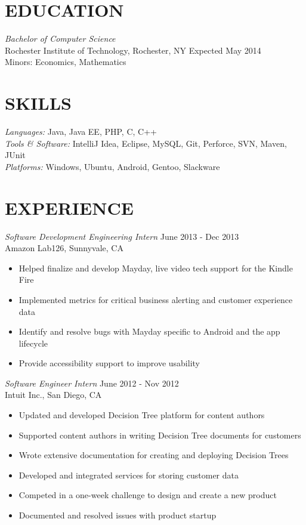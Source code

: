 \documentclass[line,margin]{res}
\begin{document}
\address{1253 Birch Street, Boonton, NJ 07005}
\address{kurtz.grant@gmail.com |  (203) 240-7149}

 
\begin{resume}
 
\section{EDUCATION} {\sl Bachelor of Computer Science} \\
	Rochester Institute of Technology, Rochester, NY  \hfill Expected May 2014 \\
	Minors: Economics, Mathematics
	
 
\section{SKILLS} {\sl Languages:} Java, Java EE, PHP, C, C++ \\
		{\sl Tools \& Software:} IntelliJ Idea, Eclipse, MySQL, Git, Perforce, SVN, Maven, JUnit \\
		{\sl Platforms:} Windows, Ubuntu, Android, Gentoo, Slackware
 
\section{EXPERIENCE}

	{\sl Software Development Engineering Intern} \hfill June 2013 - Dec 2013 \\
	    Amazon Lab126, Sunnyvale, CA
	       \begin{itemize}  \itemsep -2pt %
	\item Helped finalize and develop Mayday, live video tech support for the Kindle Fire
	\item Implemented metrics for critical business alerting and customer experience data
	\item Identify and resolve bugs with Mayday specific to Android and the app lifecycle
	\item Provide accessibility support to improve usability
	\end{itemize}

	{\sl Software Engineer Intern} \hfill June 2012 - Nov 2012 \\
               Intuit Inc.,  San Diego, CA
                 \begin{itemize}  \itemsep -2pt %
	\item Updated and developed Decision Tree platform for content authors
	\item Supported content authors in writing Decision Tree documents for customers
	\item Wrote extensive documentation for creating and deploying Decision Trees
	\item Developed and integrated services for storing customer data
	\item Competed in a one-week challenge to design and create a new product
	\item Documented and resolved issues with product startup
	\end{itemize}


\end{resume}
\end{document}
